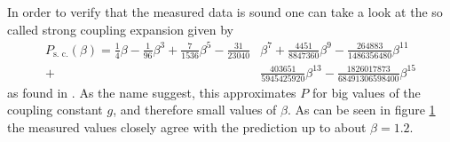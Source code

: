 \begin{figure}[!hbt]
 \begin{subfigure}[t]{0.49\textwidth}
  
  \caption{}
  \label{plot:strongCoupling}
 \end{subfigure}
 \begin{subfigure}[t]{0.49\textwidth}
  
  \caption{}
  \label{plot:weakCoupling}
 \end{subfigure}
 \centering
\end{figure}

In order to verify that the measured data is sound one can take a look at the so called strong coupling expansion given by
\begin{align*}
 P_{\textrm{s. c.}}(\beta) = \frac{1}{4} \beta - \frac{1}{96} \beta^3 + \frac{7}{1536} \beta^5 - \frac{31}{23040} & \beta^7 + \frac{4451}{8847360} \beta^9 - \frac{264883}{1486356480} \beta^{11}       \\
 +                                                                                                                & \frac{403651}{5945425920} \beta^{13} - \frac{1826017873}{68491306598400} \beta^{15}
\end{align*} as found in \cite{Denbleyker:2008}. As the name suggest, this approximates $P$ for big values of the coupling constant $g$, and therefore small values of $\beta$. As can be seen in figure \ref{plot:strongCoupling} the measured values closely agree with the prediction up to about $\beta = 1.2$.


